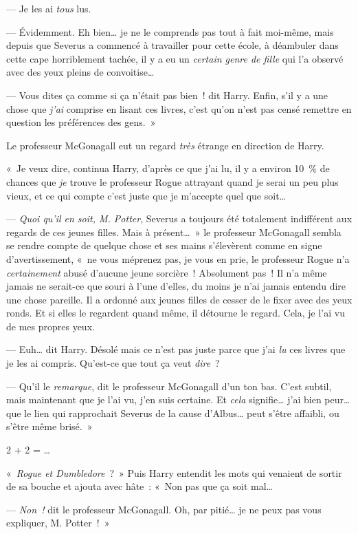 --- Je les ai \emph{tous} lus.

--- Évidemment.
Eh bien… je ne le comprends pas tout à fait moi-même, mais depuis que Severus a commencé à travailler pour cette école, à déambuler dans cette cape horriblement tachée, il y a eu un \emph{certain genre de fille} qui l'a observé avec des yeux pleins de convoitise…

--- Vous dites ça comme si ça n'était pas bien~! dit Harry.
Enfin, s'il y a une chose que \emph{j'ai} comprise en lisant ces livres, c'est qu'on n'est pas censé remettre en question les préférences des gens.~»

Le professeur McGonagall eut un regard \emph{très} étrange en direction de Harry.

«~Je veux dire, continua Harry, d'après ce que j'ai lu, il y a environ 10~\% de chances que \emph{je} trouve le professeur Rogue attrayant quand je serai un peu plus vieux, et ce qui compte c'est juste que je m'accepte quel que soit…

--- \emph{Quoi qu'il en soit, M. Potter}, Severus a toujours été totalement indifférent aux regards de ces jeunes filles.
Mais à présent…~»
le professeur McGonagall sembla se rendre compte de quelque chose et ses mains s'élevèrent comme en signe d'avertissement, «~ne vous méprenez pas, je vous en prie, le professeur Rogue n'a \emph{certainement} abusé d'aucune jeune sorcière~!
Absolument pas~!
Il n'a même jamais ne serait-ce que souri à l'une d'elles, du moins je n'ai jamais entendu dire une chose pareille.
Il a ordonné aux jeunes filles de cesser de le fixer avec des yeux ronds.
Et si elles le regardent quand même, il détourne le regard.
Cela, je l'ai vu de mes propres yeux.

--- Euh… dit Harry.
Désolé mais ce n'est pas juste parce que j'ai \emph{lu} ces livres que je les ai compris.
Qu'est-ce que tout ça veut \emph{dire}~?

--- Qu'il le \emph{remarque}, dit le professeur McGonagall d'un ton bas.
C'est subtil, mais maintenant que je l'ai vu, j'en suis certaine.
Et \emph{cela} signifie… j'ai bien peur… que le lien qui rapprochait Severus de la cause d'Albus… peut s'être affaibli, ou s'être même brisé.~»

2 + 2 = …

«~\emph{Rogue et Dumbledore}~?~»
Puis Harry entendit les mots qui venaient de sortir de sa bouche et ajouta avec hâte~: «~Non pas que ça soit mal…

--- \emph{Non~!} dit le professeur McGonagall.
Oh, par pitié… je ne peux pas vous expliquer, M. Potter~!~»


